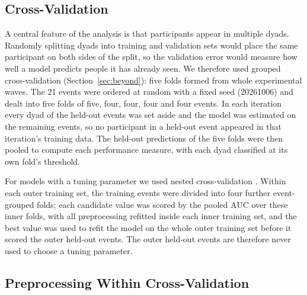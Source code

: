 
\subsection{Cross-Validation}

A central feature of the analysis is that participants appear in multiple dyads. Randomly splitting dyads into
training and validation sets would place the same participant on both sides of the split, so the validation error
would measure how well a model predicts people it has already seen. We therefore used grouped cross-validation
(Section~\ref{sec:beyond}): five folds formed from whole experimental waves. The 21 events were ordered at random
with a fixed seed (20261006) and dealt into five folds of five, four, four, four and four events. In each iteration
every dyad of the held-out events was set aside and the model was estimated on the remaining events, so no
participant in a held-out event appeared in that iteration's training data. The held-out predictions of the five
folds were then pooled to compute each performance measure, with each dyad classified at its own fold's threshold.

For models with a tuning parameter we used nested cross-validation \cite{Varma:2006}. Within each outer training
set, the training events were divided into four further event-grouped folds; each candidate value was scored by the
pooled AUC over these inner folds, with all preprocessing refitted inside each inner training set, and the best value
was used to refit the model on the whole outer training set before it scored the outer held-out events. The outer
held-out events are therefore never used to choose a tuning parameter.

\subsection{Preprocessing Within Cross-Validation}

